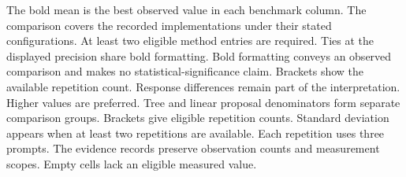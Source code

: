 \documentclass[conference,onecolumn]{IEEEtran}
\begin{document}
\begin{table}[!htp]
\begin{minipage}{\linewidth}
The bold mean is the best observed value in each benchmark column. The comparison covers the recorded implementations under their stated configurations. At least two eligible method entries are required. Ties at the displayed precision share bold formatting. Bold formatting conveys an observed comparison and makes no statistical-significance claim. Brackets show the available repetition count. Response differences remain part of the interpretation. Higher values are preferred. Tree and linear proposal denominators form separate comparison groups.
Brackets give eligible repetition counts. Standard deviation appears when at least two repetitions are available. Each repetition uses three prompts. The evidence records preserve observation counts and measurement scopes. Empty cells lack an eligible measured value.
\end{minipage}
\end{table}
\end{document}
